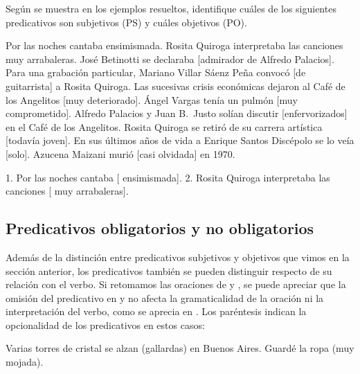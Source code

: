 \begin{ejercicio}\label{ej:09-ps-po}
Según se muestra en los ejemplos resueltos, identifique cuáles de los
siguientes predicativos son subjetivos (PS) y cuáles objetivos (PO).

\begin{exe}
  \ex Por las noches cantaba ensimismada.
  \ex Rosita Quiroga interpretaba las canciones muy arrabaleras.
  \ex José Betinotti se declaraba [admirador de Alfredo Palacios].
  \ex Para una grabación particular, Mariano Villar Sáenz Peña convocó [de
      guitarrista] a Rosita Quiroga.
  \ex Las sucesivas crisis económicas dejaron al Café de los Angelitos [muy
      deteriorado].
  \ex Ángel Vargas tenía un pulmón [muy comprometido].
  \ex Alfredo Palacios y Juan B.~Justo solían discutir [enfervorizados] en el
      Café de los Angelitos.
  \ex Rosita Quiroga se retiró de su carrera artística [todavía joven].
  \ex En sus últimos años de vida a Enrique Santos Discépolo se lo veía [solo].
  \ex Azucena Maizani murió [casi olvidada] en 1970.
\end{exe}

\begin{resuelto}
1. Por las noches cantaba [ ensimismada]. 2. Rosita Quiroga
interpretaba las canciones [ muy arrabaleras].
\end{resuelto}
\end{ejercicio}

\subsection{Predicativos obligatorios y no obligatorios}\label{sec:09-obligatorios}

Además de la distinción entre predicativos subjetivos y objetivos que vimos en la
sección anterior, los predicativos también se pueden distinguir respecto de su
relación con el verbo. Si retomamos las oraciones de  y
, se puede apreciar que la omisión del predicativo en
 y  no afecta la gramaticalidad de la
oración ni la interpretación del verbo, como se aprecia en
. Los paréntesis indican la opcionalidad de los
predicativos en estos casos:

\begin{exe}
  \ex\label{ex:09-opcionales}
    \begin{xlist}
      \ex Varias torres de cristal se alzan (gallardas) en Buenos Aires.
      \ex Guardé la ropa (muy mojada).
    \end{xlist}
\end{exe}

